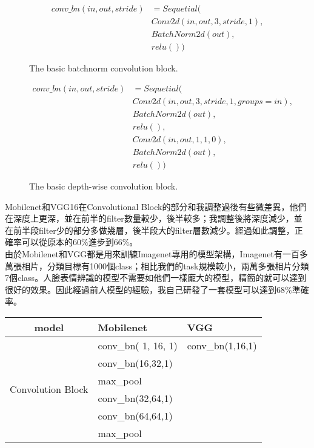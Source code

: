 \documentclass[12pt, a4paper]{article}
\begin{document}
\begin{enumerate}
\begin{figure}[h]
    \begin{align*}
        conv\_bn(in,out,stride) &= Sequetial(\\
        &Conv2d(in, out, 3, stride, 1),\\
        &BatchNorm2d(out),\\
        &relu())
    \end{align*}
    \caption{The basic batchnorm convolution block.}
    \label{fig:conv_bn}
\end{figure}

\begin{figure}[h]
    \begin{align*}
        conv\_bn(in,out,stride) &= Sequetial(\\
        &Conv2d(in, out, 3, stride, 1, groups=in),\\
        &BatchNorm2d(out),\\
        &relu(),\\
        &Conv2d(in, out, 1, 1, 0),\\
        &BatchNorm2d(out),\\
        &relu())
    \end{align*}
    \caption{The basic depth-wise convolution block.}
    \label{fig:conv_dw}
\end{figure}
Mobilenet和VGG16在Convolutional Block的部分和我調整過後有些微差異，他們在深度上更深，並在前半的filter數量較少，後半較多；我調整後將深度減少，並在前半段filter少的部分多做幾層，後半段大的filter層數減少。經過如此調整，正確率可以從原本的$60\%$進步到$66\%$。\\
由於Mobilenet和VGG都是用來訓練Imagenet專用的模型架構，Imagenet有一百多萬張相片，分類目標有1000個class；相比我們的task規模較小，兩萬多張相片分類7個class。人臉表情辨識的模型不需要如他們一樣龐大的模型，精簡的就可以達到很好的效果。因此經過前人模型的經驗，我自己研發了一套模型可以達到$68\%$準確率。
\begin{table}[h]
\centering
\begin{tabular}{|c|l|l|}\hline
    model&Mobilenet & VGG\\ \hline
    \multirow{12}{*}{Convolution Block}&conv\_bn(  1,  16, 1)&conv\_bn(1,16,1)\\
    &conv\_bn(16,32,1)\\
    &max\_pool\\
    &conv\_bn(32,64,1)\\
    &conv\_bn(64,64,1)\\
    &max\_pool\\

\end{tabular}
\end{table}
\end{enumerate}
\end{document}
